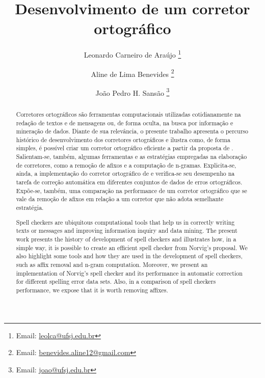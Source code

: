 \documentclass{textolivre}
\title{Desenvolvimento de um corretor ortográfico}
\author[1]{Leonardo Carneiro de Araújo \orcid{0000-0003-3884-2177} \thanks{Email: \url{leolca@ufsj.edu.br}}}
\author[2]{Aline de Lima Benevides \orcid{0000-0003-1814-593X} \thanks{Email: \url{benevides.aline12@gmail.com}}}
\author[1]{João Pedro H. Sansão \orcid{0000-0003-0095-2629} \thanks{Email: \url{joao@ufsj.edu.br}}}
\affil[1]{Universidade Federal de São João del Rei, Ouro Branco, MG, Brasil.}
\affil[2]{Universidade de São Paulo, São Paulo, SP, Brasil.}
\begin{document}
\maketitle

\begin{polyabstract}
\begin{abstract}
Corretores ortográficos são ferramentas computacionais utilizadas cotidianamente
na redação de textos e de mensagens ou, de forma oculta, na busca por informação e mineração
de dados. Diante de sua relevância, o presente trabalho apresenta
o percurso histórico de desenvolvimento dos corretores ortográficos
e ilustra como, 
de forma simples, é possível criar um corretor ortográfico eficiente a partir
da proposta de \textcite{norvig2007}.
Salientam-se, também, algumas ferramentas e as estratégias empregadas na elaboração
de corretores, como a remoção de afixos e a computação de n-gramas.
Explicita-se, ainda, a implementação do corretor ortográfico de \textcite{norvig2007} e
verifica-se seu desempenho na tarefa de correção automática em diferentes conjuntos de
dados de erros ortográficos. Expõe-se, também, uma comparação na performance de um corretor ortográfico
que se vale da remoção de afixos em relação a um corretor que não adota semelhante estratégia.

\end{abstract}

\begin{english}
\begin{abstract}
Spell checkers are ubiquitous computational tools that help us in correctly writing texts or messages
and improving information inquiry and data mining.
The present work presents the history of development of spell checkers and illustrates how,
in a simple way, it is possible to create an efficient spell checker from Norvig's proposal. %
We also highlight some tools and how they are used in the development of spell checkers, such as affix removal and n-gram computation.
Moreover, we present an implementation of Norvig's spell checker and its performance
in automatic correction for different spelling error data sets.
Also, in a comparison of spell checkers performance, we expose that it is worth removing affixes.

\end{abstract}
\end{english}

\end{polyabstract}
\end{document}
